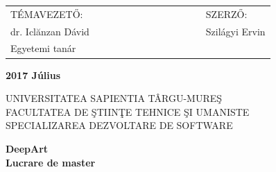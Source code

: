 \documentclass[12pt, a4paper, oneside]{book}
\theoremstyle{tetel}
\begin{document}
\vspace{2cm}
\begin{center}
\begin{tabular}{lcccccccccccl}
    TÉMAVEZETŐ:&&&&&&& &&&&&SZERZŐ:\\
     dr. Iclănzan Dávid&&&&&& &&&&&&Szilágyi Ervin\\
	Egyetemi tanár
\end{tabular}
\end{center}

\begin{center}
    \vspace{0.5cm}\textbf{2017 Július}
\end{center}
\vspace*{\fill}
\newpage
\thispagestyle{empty}
\begin{center}
    \Large UNIVERSITATEA SAPIENTIA TÂRGU-MURE\c{S}\\
    \Large FACULTATEA DE \c{S}TIIN\c{T}E TEHNICE \c{S}I UMANISTE\\
    \Large SPECIALIZAREA DEZVOLTARE DE SOFTWARE\\
\end{center}

\begin{center}
    \vspace{3cm}\LARGE \textbf{DeepArt}\\
    \vspace{1cm}\LARGE\textbf{Lucrare de master}\\
\end{center}
\end{document}

